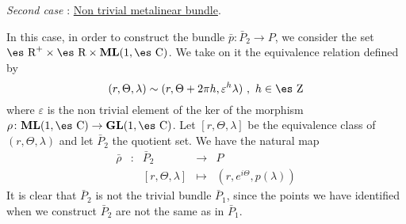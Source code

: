 \documentclass[12pt]{article}
\theoremstyle{plain}
\def\Zahl{\mbox{\es Z}}
\def\Real{\mbox{\es R}}
\def\Complex{\mbox{\es C}}
\begin{document}
{\it Second case \/}: \underline{ Non trivial metalinear bundle}.

In this case, in order to construct the bundle
$\bar p \colon \bar P_2 \to P$, we consider the set
$\Real^+ \times \Real \times {\bf ML}(1,\Complex )$.
We take on it the equivalence relation defined by
$$
(r,\Theta ,\lambda ) \sim (r,\Theta +2\pi h,\varepsilon^h\lambda )
\ , \ h \in \Zahl
$$
where $\varepsilon$ is the non trivial element
of the ker of the morphism
$\rho \colon {\bf ML}(1,\Complex ) \to {\bf GL}(1,\Complex )$.
Let $[r,\Theta ,\lambda ]$ be the equivalence class of
$(r,\Theta ,\lambda )$ and let $\bar P_2$ the quotient set.
We have the natural map
$$
\begin{array}{ccccc}
\bar \rho & \colon & \bar P_2 & \rightarrow & P
\\
& & [r,\Theta ,\lambda ] & \mapsto & (r,e^{i\Theta},p(\lambda ))
\end{array}
$$
It is clear that $\bar P_2$ is not
the trivial bundle $\bar P_1$,
since the points we have identified when we construct
$\bar P_2$ are not the same as in $\bar P_1$.
\end{document}
